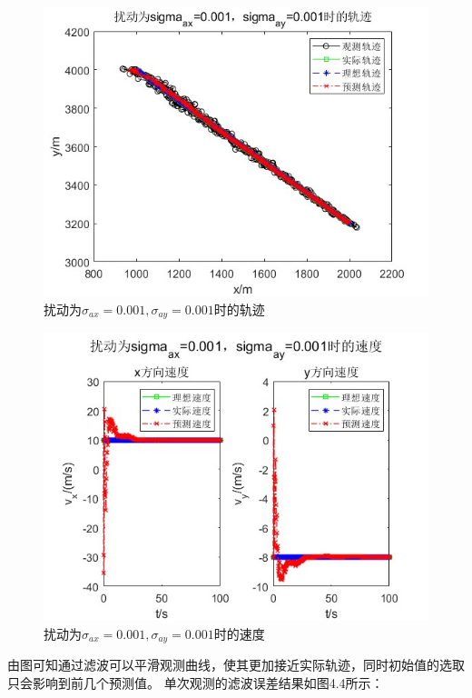 \documentclass[fontset=windows]{article}
\numberwithin{figure}{section}
\begin{document}
\begin{figure}[H]
    \centering
    \includegraphics[scale=0.8]{4_2.jpg}
    \caption{扰动为\(\sigma_{ax}=0.001,\sigma_{ay}=0.001\)时的轨迹}
    \label{4.2}
\end{figure}

\begin{figure}[H]
    \centering
    \includegraphics[scale=0.8]{4_3.jpg}
    \caption{扰动为\(\sigma_{ax}=0.001,\sigma_{ay}=0.001\)时的速度}
    \label{4.3}
\end{figure}

由图可知通过滤波可以平滑观测曲线，使其更加接近实际轨迹，同时初始值的选取只会影响到前几个预测值。
单次观测的滤波误差结果如图4.4所示：
\end{document}
